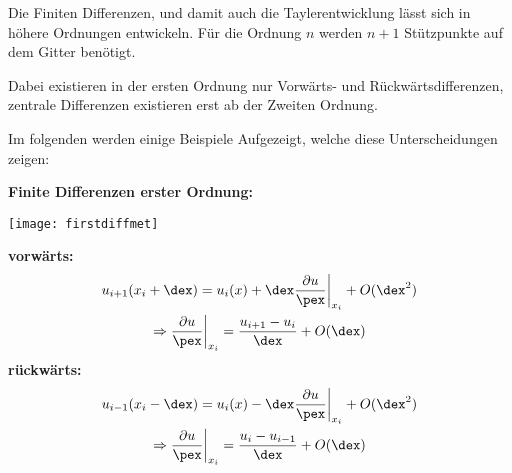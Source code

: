 Die Finiten Differenzen, und damit auch die Taylerentwicklung l\"asst sich in h\"ohere Ordnungen entwickeln. F\"ur die Ordnung $n$ werden $n+1$ St\"utzpunkte auf dem Gitter ben\"otigt.
\par
Dabei existieren in der ersten Ordnung nur Vorw\"arts- und R\"uckw\"artsdifferenzen, zentrale Differenzen existieren erst ab der Zweiten Ordnung.
\par
Im folgenden werden einige Beispiele Aufgezeigt, welche diese Unterscheidungen zeigen:


\newpage

\textbf{Finite Differenzen erster Ordnung:}
\begin{multicols}{2}
\vspace{-2em}
\texttt{[image: firstdiffmet]}


\vfill\null
\columnbreak

\textbf{vorw\"arts:}
\vspace{-1.5em}
\begin{multline*} 
	u_{i+1}(x_i+\dex) = u_i(x) + \dex\frac{\partial u}{\pex}\bigg|_{x_i} + O(\dex^2) \\ 
	\Rightarrow \frac{\partial u}{\pex}\bigg|_{x_i} = \frac{u_{i+1} - u_i}{\dex} + O(\dex)
\end{multline*}
\vspace{-1.5em}
\textbf{r\"uckw\"arts:}
\begin{multline*} 
	u_{i-1}(x_i-\dex) = u_i(x) - \dex\frac{\partial u}{\pex}\bigg|_{x_i} + O(\dex^2) \\ \Rightarrow \frac{\partial u}{\pex}\bigg|_{x_i} = \frac{u_{i} - u_{i-1}}{\dex} + O(\dex)
\end{multline*}

\end{multicols}


